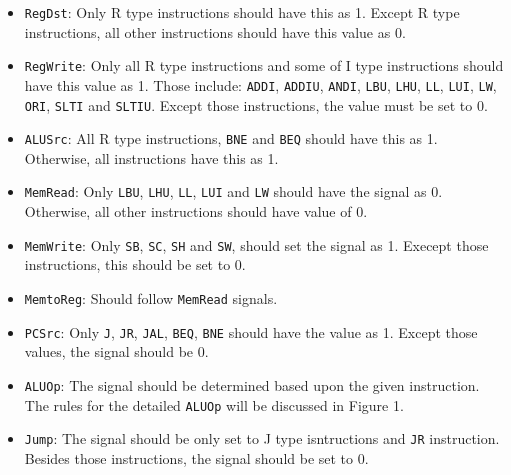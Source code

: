 \documentclass{homework}
\begin{document}
\begin{itemize}
    \item \texttt{RegDst}: Only R type instructions should have this as 1. Except R type instructions, all other instructions should have this value as 0.
    \item \texttt{RegWrite}: Only all R type instructions and some of I type instructions should have this value as 1. Those include: \texttt{ADDI}, \texttt{ADDIU}, \texttt{ANDI}, \texttt{LBU}, \texttt{LHU}, \texttt{LL}, \texttt{LUI}, \texttt{LW}, \texttt{ORI}, \texttt{SLTI} and \texttt{SLTIU}. Except those instructions, the value must be set to 0.
    \item \texttt{ALUSrc}: All R type instructions, \texttt{BNE} and \texttt{BEQ} should have this as 1. Otherwise, all instructions have this as 1.
    \item \texttt{MemRead}: Only \texttt{LBU}, \texttt{LHU}, \texttt{LL}, \texttt{LUI} and \texttt{LW} should have the signal as 0. Otherwise, all other instructions should have value of 0.
    \item \texttt{MemWrite}: Only \texttt{SB}, \texttt{SC}, \texttt{SH} and \texttt{SW}, should set the signal as 1. Execept those instructions, this should be set to 0.
    \item \texttt{MemtoReg}: Should follow \texttt{MemRead} signals.
    \item \texttt{PCSrc}: Only \texttt{J}, \texttt{JR}, \texttt{JAL}, \texttt{BEQ}, \texttt{BNE} should have the value as 1. Except those values, the signal should be 0.
    \item \texttt{ALUOp}: The signal should be determined based upon the given instruction. The rules for the detailed \texttt{ALUOp} will be discussed in Figure 1.
    \item \texttt{Jump}: The signal should be only set to J type isntructions and \texttt{JR} instruction. Besides those instructions, the signal should be set to 0.
\end{itemize}
\end{document}
